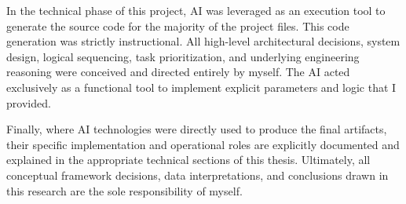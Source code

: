 \documentclass[11pt, a4paper,twoside,openany]{tfg_dtic_upf}
\let\cleardoublepage\clearpage
\numberwithin{equation}{section}
\begin{document}
\medskip

In the technical phase of this project, AI was leveraged as an execution tool to generate the source code for the majority of the project files. This code generation was strictly instructional. All high-level architectural decisions, system design, logical sequencing, task prioritization, and underlying engineering reasoning were conceived and directed entirely by myself. The AI acted exclusively as a functional tool to implement explicit parameters and logic that I provided.

\medskip

Finally, where AI technologies were directly used to produce the final artifacts, their specific implementation and operational roles are explicitly documented and explained in the appropriate technical sections of this thesis. Ultimately, all conceptual framework decisions, data interpretations, and conclusions drawn in this research are the sole responsibility of myself.

\cleardoublepage









\clearpage
{}


\clearpage

\end{document}
